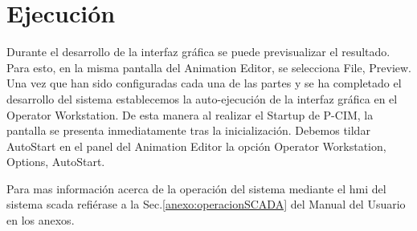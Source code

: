 

\section{Ejecución}
\label{sec:Ejecucion}
Durante el desarrollo de la interfaz gráfica se puede previsualizar 
el resultado. Para esto, en la misma pantalla del Animation Editor,
se selecciona File, Preview. Una vez que han sido configuradas cada una de las 
partes y se ha completado el desarrollo del sistema establecemos
la auto-ejecución de la interfaz gráfica en el Operator Workstation. De esta 
manera al realizar el Startup de P-CIM, la pantalla se presenta inmediatamente 
tras la inicialización. Debemos tildar AutoStart en el panel del Animation 
Editor la opción Operator Workstation, Options, AutoStart.

Para mas información acerca de la operación del sistema mediante el \gls{hmi} 
del sistema \gls{scada} refiérase a la Sec.\ref{anexo:operacionSCADA} del 
Manual del Usuario en los anexos.
